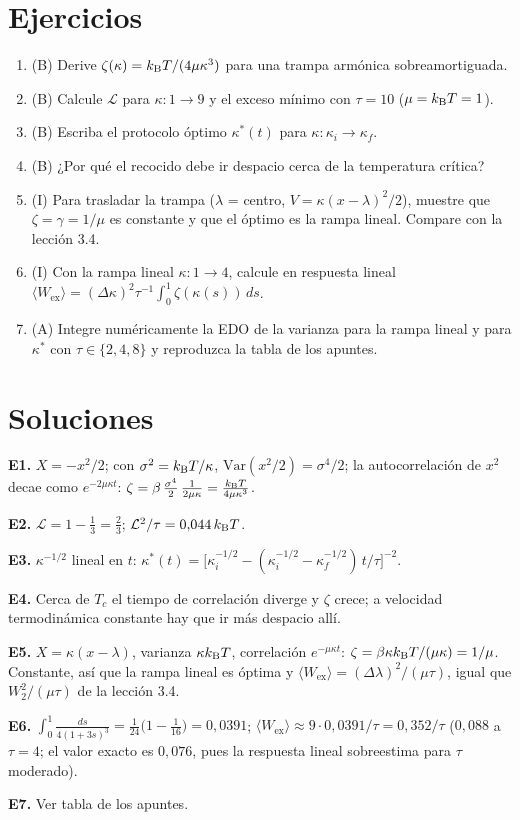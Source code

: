\documentclass[11pt,a4paper]{article}
\begin{document}
\section{Ejercicios}
\begin{enumerate}[label=\textbf{E\arabic*.}]
\item (B) Derive $\zeta(\kappa)=k_{\mathrm B} T/(4\mu\kappa^3)$ para una trampa armónica sobreamortiguada.
\item (B) Calcule $\mathcal L$ para $\kappa:1\to9$ y el exceso mínimo con $\tau=10$ ($\mu=k_{\mathrm B} T=1$).
\item (B) Escriba el protocolo óptimo $\kappa^*(t)$ para $\kappa:\kappa_i\to\kappa_f$.
\item (B) ¿Por qué el recocido debe ir despacio cerca de la temperatura crítica?
\item (I) Para trasladar la trampa ($\lambda$ = centro, $V=\kappa(x-\lambda)^2/2$), muestre que $\zeta=\gamma=1/\mu$ es constante y que el óptimo es la
rampa lineal. Compare con la lección 3.4.
\item (I) Con la rampa lineal $\kappa:1\to4$, calcule en respuesta lineal $\langle W_{\text{ex}}\rangle=(\Delta\kappa)^2\tau^{-1}\int_0^1\zeta(\kappa(s))\,ds$.
\item (A) Integre numéricamente la EDO de la varianza para la rampa lineal y para $\kappa^*$ con $\tau\in\{2,4,8\}$ y reproduzca la tabla de los apuntes.
\end{enumerate}
\section{Soluciones}
\begin{solucion}
\textbf{E1.} $X=-x^2/2$; con $\sigma^2=k_{\mathrm B} T/\kappa$, $\mathrm{Var}(x^2/2)=\sigma^4/2$; la autocorrelación de $x^2$ decae como $e^{-2\mu\kappa t}$:
$\zeta=\beta\,\frac{\sigma^4}{2}\,\frac{1}{2\mu\kappa}=\frac{k_{\mathrm B} T}{4\mu\kappa^3}$.

\textbf{E2.} $\mathcal L=1-\tfrac13=\tfrac23$; $\mathcal L^2/\tau=0{,}044\,k_{\mathrm B} T$.

\textbf{E3.} $\kappa^{-1/2}$ lineal en $t$: $\kappa^*(t)=\big[\kappa_i^{-1/2}-(\kappa_i^{-1/2}-\kappa_f^{-1/2})\,t/\tau\big]^{-2}$.

\textbf{E4.} Cerca de $T_c$ el tiempo de correlación diverge y $\zeta$ crece; a velocidad termodinámica constante hay que ir más despacio allí.

\textbf{E5.} $X=\kappa(x-\lambda)$, varianza $\kappa k_{\mathrm B} T$, correlación $e^{-\mu\kappa t}$: $\zeta=\beta\kappa k_{\mathrm B} T/(\mu\kappa)=1/\mu$. Constante, así que la
rampa lineal es óptima y $\langle W_{\text{ex}}\rangle=(\Delta\lambda)^2/(\mu\tau)$, igual que $W_2^2/(\mu\tau)$ de la lección 3.4.

\textbf{E6.} $\int_0^1\frac{ds}{4(1+3s)^3}=\frac{1}{24}\big(1-\tfrac1{16}\big)=0{,}0391$; $\langle W_{\text{ex}}\rangle\approx9\cdot0{,}0391/\tau=0{,}352/\tau$
($0{,}088$ a $\tau=4$; el valor exacto es $0{,}076$, pues la respuesta lineal sobreestima para $\tau$ moderado).

\textbf{E7.} Ver tabla de los apuntes.
\end{solucion}
\end{document}

